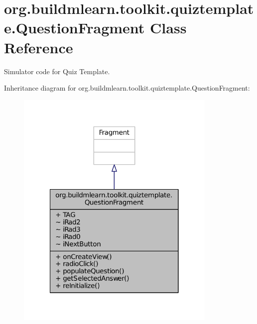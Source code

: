 \hypertarget{classorg_1_1buildmlearn_1_1toolkit_1_1quiztemplate_1_1QuestionFragment}{\section{org.\-buildmlearn.\-toolkit.\-quiztemplate.\-Question\-Fragment Class Reference}
\label{classorg_1_1buildmlearn_1_1toolkit_1_1quiztemplate_1_1QuestionFragment}
}


Simulator code for Quiz Template.  




Inheritance diagram for org.\-buildmlearn.\-toolkit.\-quiztemplate.\-Question\-Fragment\-:
\nopagebreak
\begin{figure}[H]
\begin{center}
\leavevmode
\includegraphics[width=272pt]{d7/d5d/classorg_1_1buildmlearn_1_1toolkit_1_1quiztemplate_1_1QuestionFragment__inherit__graph}
\end{center}
\end{figure}


